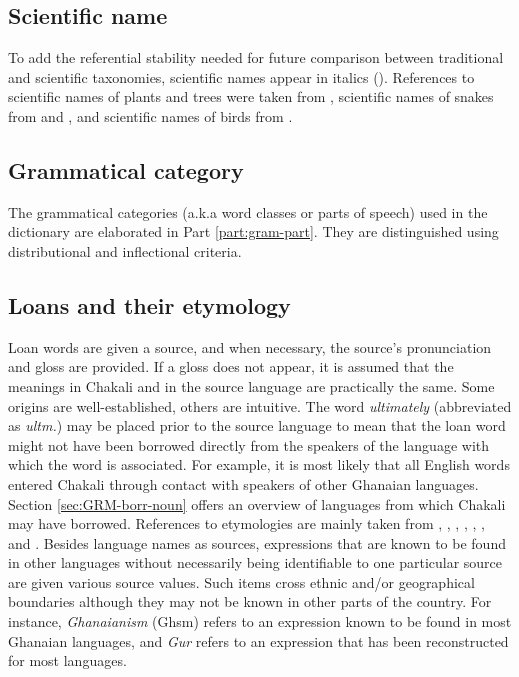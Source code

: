 \subsection{Scientific name}
\label{sec:INT-sci-name}

To  add the referential stability needed for future comparison between traditional  and scientific  taxonomies, scientific names appear in italics  ().   References to scientific names of  plants and trees were taken from \citet{hawt06},  scientific names of  snakes from \citet{Cans61}  and \citet{Trap06}, and scientific names of  birds from \citet{borr02}.

\subsection{Grammatical category}
\label{sec:INT-other-lex-field}

The grammatical categories (a.k.a  word classes or parts of speech)  used in the dictionary are elaborated in Part \ref{part:gram-part}.  They are distinguished using distributional and inflectional criteria. 


\subsection{Loans and their etymology}
\label{sec:INT-loan-ety}


Loan words are given a source, and when necessary, the source's pronunciation and 
gloss are provided. If a gloss does not appear, it is assumed that the meanings in Chakali and in the source language are practically the same. Some origins are well-established, others are intuitive. The 
word  {\it ultimately} (abbreviated as {\it ultm.}) may be placed prior to the source language
to mean that the loan word might not have been borrowed directly from the 
speakers of the language with which the word is associated. For example, it is 
most likely that all English words entered Chakali  through contact with 
speakers of other Ghanaian languages.  Section \ref{sec:GRM-borr-noun} offers an 
overview of languages from which Chakali may have borrowed.  References to 
etymologies are mainly taken from \citet{newm07hausa}, \citet{daku07},   \citet{bald08},
\citet{daku09ga},  \cite{vagl80},  \citet{Dume11}, and \citet{vydr15}. Besides language names as sources,  expressions that are known to be found in other languages without necessarily being identifiable to one particular source are given various source values. Such items cross ethnic and/or geographical boundaries although they may not be known in other parts of the country.  For instance, {\it Ghanaianism} (Ghsm) refers to an expression known to be found in most Ghanaian languages,  and {\it Gur} refers to an expression that has been reconstructed for most  languages. 


